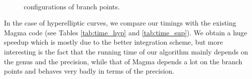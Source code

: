 \documentclass[main.tex]{subfiles}
\begin{document}
  \begin{figure}[H]
      \begin{center}
          \\
      \end{center}
      \caption{configurations of branch points.}
  \label{fig:roots_bern}
  \end{figure}

  In the case of hyperelliptic curves, we compare our timings with the existing
  Magma code \cite{vanWamelen06} (see Tables \ref{tab:time_hyp} and \ref{tab:time_sup}).
  We obtain a huge speedup which is mostly due
  to the better integration scheme, but more interesting is the fact that the
  running time of our algorithm mainly depends on the genus and the precision,
  while that of Magma depends a lot on the branch points and behaves very badly
  in terms of the precision.
\end{document}

